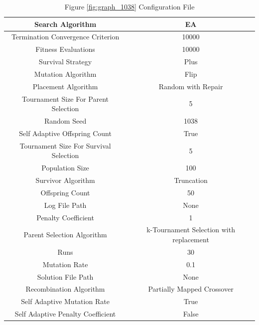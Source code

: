 \documentclass{standalone}
\begin{document}
\begin{table}[!htb]
	\centering
	\caption{Figure \ref{fig:graph_1038} Configuration File}
	\label{tab:graph_1038}
	\begin{tabular}{| c | c |}
		\hline
		Search Algorithm		& EA		 \\
		\hline
		Termination Convergence Criterion		& 10000		 \\
		\hline
		Fitness Evaluations		& 10000		 \\
		\hline
		Survival Strategy		& Plus		 \\
		\hline
		Mutation Algorithm		& Flip		 \\
		\hline
		Placement Algorithm		& Random with Repair		 \\
		\hline
		Tournament Size For Parent Selection		& 5		 \\
		\hline
		Random Seed		& 1038		 \\
		\hline
		Self Adaptive Offspring Count		& True		 \\
		\hline
		Tournament Size For Survival Selection		& 5		 \\
		\hline
		Population Size		& 100		 \\
		\hline
		Survivor Algorithm		& Truncation		 \\
		\hline
		Offspring Count		& 50		 \\
		\hline
		Log File Path		& None		 \\
		\hline
		Penalty Coefficient		& 1		 \\
		\hline
		Parent Selection Algorithm		& k-Tournament Selection with replacement		 \\
		\hline
		Runs		& 30		 \\
		\hline
		Mutation Rate		& 0.1		 \\
		\hline
		Solution File Path		& None		 \\
		\hline
		Recombination Algorithm		& Partially Mapped Crossover		 \\
		\hline
		Self Adaptive Mutation Rate		& True		 \\
		\hline
		Self Adaptive Penalty Coefficient		& False		 \\
		\hline
	\end{tabular}
\end{table}
\end{document}
